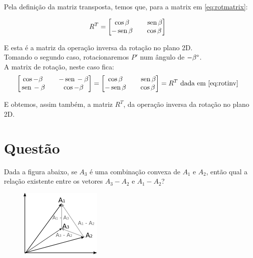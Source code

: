 \documentclass[a4paper,11pt,pagenumber=true]{article}
\renewcommand{\sin}{\text{\,sen\,}}
\theoremstyle{mytheor}
\begin{document}
            Pela definição da matriz transposta, temos que, para a matrix em \ref{eq:rotmatrix}: 
            
            \begin{equation}
                R^T = 
                \begin{bmatrix}
                    \cos\beta   && \sin\beta \\
                    -\sin\beta  && \cos\beta
                \end{bmatrix}
                \label{eq:rotinv}
            \end{equation}
            
            E esta é a matriz da operação inversa da rotação no plano 2D. \\
            
            Tomando o segundo caso, rotacionaremos $P'$ num ângulo de $-\beta\degree$. \\
            
            A matrix de rotação, neste caso fica:
            \[
                \begin{bmatrix}
                    \cos -\beta && -\sin -\beta  \\
                    \sin -\beta && \cos -\beta
                \end{bmatrix} = 
                \begin{bmatrix}
                    \cos\beta   && \sin\beta \\
                    -\sin\beta  && \cos\beta
                \end{bmatrix} = R^T \text{ dada em \ref{eq:rotinv}}
            \]
            
            E obtemos, assim também, a matriz $R^T$, da operação inversa da rotação no plano 2D.
            
    \section{Questão }

        Dada a figura abaixo, se $A_3$ é uma combinação convexa de $A_1$ e $A_2$, então qual a relação existente entre os vetores $A_3-A_2$ e $A_1-A_2$? 
        
        \begin{figure}[h]
        \centering
            \includegraphics{images/Q-3.png}
            \label{fig:q3}
        \end{figure}        
        
\end{document}
